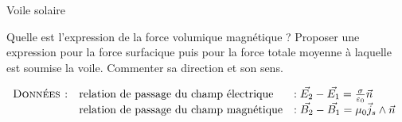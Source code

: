\begin{exo}[PSI][2]{Voile solaire}
\begin{quest}
\item Quelle est l’expression de la force volumique magnétique ? Proposer une expression pour la force surfacique puis pour la force totale moyenne à laquelle est soumise la voile. Commenter
sa direction et son sens.


\end{quest}
$\begin{array}{lll}
\textsc{Données :}
& \text{relation de passage du champ électrique} & :  \Vec{E_2} - \Vec{E_1} = \frac{\sigma}{\varepsilon_0} \Vec{n} \\
& \text{relation de passage du champ magnétique} & :  \Vec{B_2} - \Vec{B_1} = \mu_0 \Vec{j}_s \wedge \Vec{n} \\
\end{array}
$

\end{exo}
